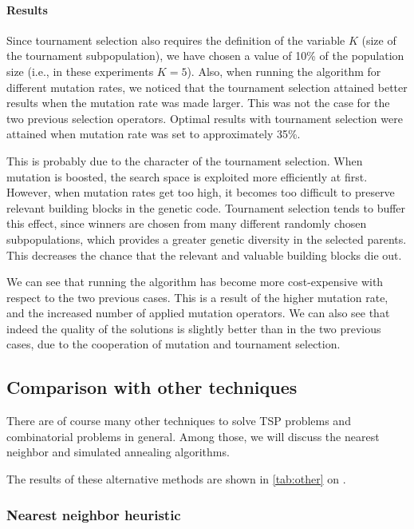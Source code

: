 ﻿\documentclass[a4paper,english,11pt,]{scrartcl}
\begin{document}
\paragraph{Results}
Since tournament selection also requires the definition of the variable $K$ (size of the tournament subpopulation), we have chosen a value of 10\% of the population size (i.e., in these experiments $K=5$). Also, when running the algorithm for different mutation rates, we noticed that the tournament selection attained better results when the mutation rate was made larger. This was not the case for the two previous selection operators. Optimal results with tournament selection were attained when mutation rate was set to approximately 35\%. 

% 


This is probably due to the character of the tournament selection. When mutation is boosted, the search space is exploited more efficiently at first. However, when mutation rates get too high, it becomes too difficult to preserve relevant building blocks in the genetic code. Tournament selection tends to buffer this effect, since winners are chosen from many different randomly chosen subpopulations, which provides a greater genetic diversity in the selected parents. This decreases the chance that the relevant and valuable building blocks die out.

We can see that running the algorithm has become more cost-expensive with respect to the two previous cases. This is a result of the higher mutation rate, and the increased number of applied mutation operators. We can also see that indeed the quality of the solutions is slightly better than in the two previous cases, due to the cooperation of mutation and tournament selection. 


\subsection{Comparison with other techniques}
There are of course many other techniques to solve TSP problems and combinatorial problems in general.
Among those, we will discuss the nearest neighbor and simulated annealing algorithms.

The results of these alternative methods are shown in \autoref{tab:other} on .

\subsubsection{Nearest neighbor heuristic}
\end{document}
